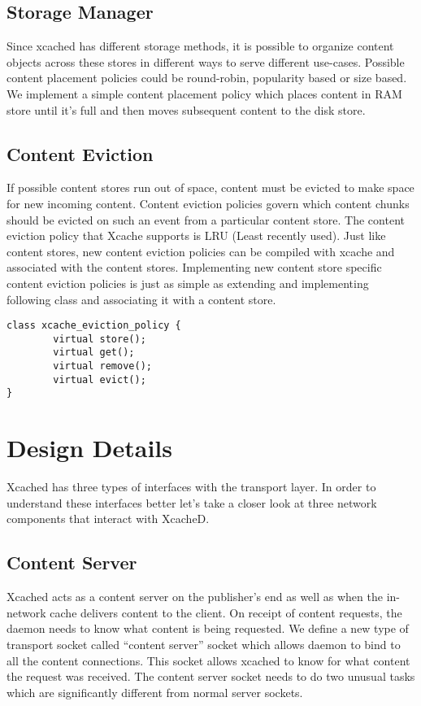 \subsection{Storage Manager}
Since xcached has different storage methods, it is possible to
organize content objects across these stores in different ways to
serve different use-cases. Possible content placement policies could
be round-robin, popularity based or size based. We implement a simple
content placement policy which places content in RAM store until it’s
full and then moves subsequent content to the disk store.

\subsection{Content Eviction}
If possible content stores run out of space, content must be evicted
to make space for new incoming content. Content eviction policies
govern which content chunks should be evicted on such an event from a
particular content store. The content eviction policy that Xcache
supports is LRU (Least recently used). Just like content stores, new
content eviction policies can be compiled with xcache and associated
with the content stores. Implementing new content store specific
content eviction policies is just as simple as extending and
implementing following class and associating it with a content store.

{
\begin{verbatim}
class xcache_eviction_policy {
        virtual store();
        virtual get();
        virtual remove();
        virtual evict();
}
\end{verbatim}
}


\section {Design Details}

Xcached has three types of interfaces with the transport layer. In
order to understand these interfaces better let's take a closer look
at three network components that interact with XcacheD.

\subsection{Content Server}
Xcached acts as a content server on the publisher's end as well as
when the in-network cache delivers content to the client. On receipt
of content requests, the daemon needs to know what content is being
requested. We define a new type of transport socket called ``content
server'' socket which allows daemon to bind to all the content
connections. This socket allows xcached to know for what content the
request was received.  The content server socket needs to do two
unusual tasks which are significantly different from normal server
sockets.

